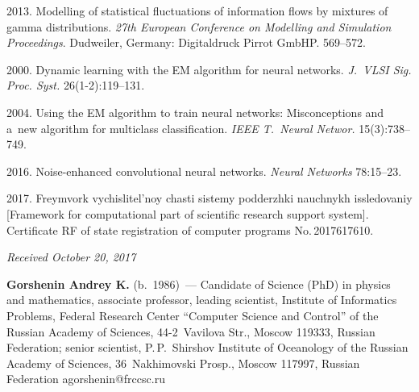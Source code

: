 \begin{multicols}{2}
{{\begin{thebibliography}{99}
 2013.  
Modelling of statistical fluctuations of
information flows by mixtures of gamma distributions. 
\textit{27th
European Conference on Modelling and Simulation Proceedings}.
Dudweiler, Germany: Digitaldruck Pirrot GmbHP. 569--572.

 2000. Dynamic learning with the EM
algorithm for neural networks. \textit{J.~VLSI Sig. Proc. Syst.} 26(1-2):119--131.

 2004. Using the EM algorithm to train neural
networks: Misconceptions and a~new algorithm for multiclass classification. 
\textit{IEEE T.~Neural Networ.} 15(3):738--749.

 2016. Noise-enhanced convolutional
neural networks. \textit{Neural Networks} 78:15--23.

 2017. 
Freymvork vychislitel'noy chasti sistemy
podderzhki nauchnykh issledovaniy [Framework for computational part of  scientific
research support system]. Certificate RF of state registration of computer programs
No.\,2017617610.
\end{thebibliography}

 }
 }

\end{multicols}

\vspace*{-6pt}

\hfill{\small\textit{Received October 20, 2017}}



\Contrl

\noindent
\textbf{Gorshenin Andrey K.} (b.\ 1986)~--- Candidate of Science (PhD) in physics and
mathematics, associate professor, leading scientist, Institute of Informatics Problems,
Federal Research Center ``Computer Science and Control'' of the Russian Academy of
Sciences, 44-2~Vavilova Str., Moscow 119333, Russian Federation;
senior scientist, P.\,P.~Shirshov Institute of Oceanology of the Russian Academy of Sciences,
36~Nakhimovski Prosp., Moscow 117997, Russian Federation
\mbox{agorshenin@frccsc.ru}

\label{end\stat}


\renewcommand{\bibname}{\protect\rm Литература} 